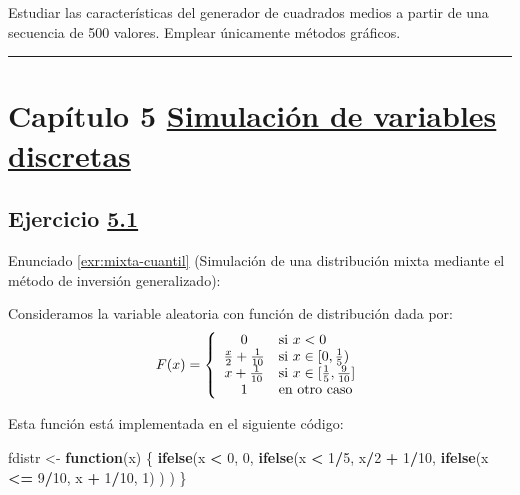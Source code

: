 \documentclass[
  spanish,
  10pt,
]{book}
\newenvironment{Shaded}{\begin{snugshade}}{\end{snugshade}}
\newcommand{\ControlFlowTok}[1]{\textcolor[rgb]{0.13,0.29,0.53}{\textbf{#1}}}
\newcommand{\DecValTok}[1]{\textcolor[rgb]{0.00,0.00,0.81}{#1}}
\newcommand{\FunctionTok}[1]{\textcolor[rgb]{0.13,0.29,0.53}{\textbf{#1}}}
\newcommand{\NormalTok}[1]{#1}
\newcommand{\OtherTok}[1]{\textcolor[rgb]{0.56,0.35,0.01}{#1}}
\newcommand{\SpecialCharTok}[1]{\textcolor[rgb]{0.81,0.36,0.00}{\textbf{#1}}}
\theoremstyle{break}
\theoremstyle{nonumberplain}
\begin{document}
Estudiar las características del generador de cuadrados medios a partir de una secuencia de 500 valores.
Emplear únicamente métodos gráficos.

\begin{center}\rule{0.5\linewidth}{0.5pt}\end{center}

\section{\texorpdfstring{Capítulo 5 \href{discretas.html}{Simulación de variables discretas}}{Capítulo 5 Simulación de variables discretas}}\label{capuxedtulo-5-simulaciuxf3n-de-variables-discretas}

\subsection{\texorpdfstring{Ejercicio \href{ejercicios-discretas.html\#exr:mixta-cuantil}{5.1}}{Ejercicio 5.1}}\label{sol-mixta-cuantil}

Enunciado \ref{exr:mixta-cuantil} (Simulación de una distribución mixta mediante el método de inversión generalizado):

Consideramos la variable aleatoria con función de distribución dada por:
\[F(x)=\left\{
\begin{array}
[c]{cl}0 & \mbox{si $x<0$}\\
\frac{x}{2}+\frac{1}{10} & \mbox{si $x\in[0,\frac{1}{5})$}\\
x+\frac{1}{10} & \mbox{si $x\in[\frac{1}{5},\frac{9}{10}]$}\\
1 & \mbox{en otro caso}
\end{array}
\right.\]

Esta función está implementada en el siguiente código:

\begin{Shaded}
\begin{Highlighting}[]
\NormalTok{fdistr }\OtherTok{\textless{}{-}} \ControlFlowTok{function}\NormalTok{(x) \{}
\FunctionTok{ifelse}\NormalTok{(x }\SpecialCharTok{\textless{}} \DecValTok{0}\NormalTok{, }\DecValTok{0}\NormalTok{,}
    \FunctionTok{ifelse}\NormalTok{(x }\SpecialCharTok{\textless{}} \DecValTok{1}\SpecialCharTok{/}\DecValTok{5}\NormalTok{, x}\SpecialCharTok{/}\DecValTok{2} \SpecialCharTok{+} \DecValTok{1}\SpecialCharTok{/}\DecValTok{10}\NormalTok{,}
        \FunctionTok{ifelse}\NormalTok{(x }\SpecialCharTok{\textless{}=} \DecValTok{9}\SpecialCharTok{/}\DecValTok{10}\NormalTok{, x }\SpecialCharTok{+} \DecValTok{1}\SpecialCharTok{/}\DecValTok{10}\NormalTok{, }\DecValTok{1}\NormalTok{) ) )}
\NormalTok{\}}
\end{Highlighting}
\end{Shaded}
\end{document}
